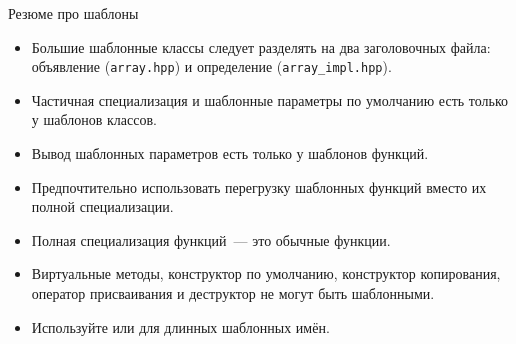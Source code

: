 \documentclass{beamer}
\begin{document}
\begin{frame}[fragile]{Резюме про шаблоны}
\small
    \begin{itemize}
        \item
            Большие шаблонные классы следует разделять на два заголовочных файла:
            объявление (\texttt{array.hpp}) и определение (\texttt{array\_impl.hpp}).

        \item Частичная специализация и шаблонные параметры по умолчанию
            есть только у шаблонов классов.

        \item Вывод шаблонных параметров есть только у шаблонов функций.

        \item Предпочтительно использовать перегрузку шаблонных функций вместо
            их полной специализации.

        \item Полная специализация функций~--- это обычные функции.
    
        \item Виртуальные методы, конструктор по умолчанию, конструктор
            копирования, оператор присваивания и деструктор не могут быть
            шаблонными.
        \item Используйте  или  для длинных шаблонных имён.
    \end{itemize}
\end{frame}
\end{document}
